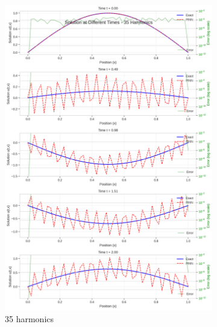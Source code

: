 \begin{figure}[H]
    \centering
    \begin{subfigure}[b]{0.32\textwidth}
        \centering
        \includegraphics[width=\textwidth]{figures/time_slices_35h.png}
        \caption{35 harmonics}
    \end{subfigure}
    \hfill
    \begin{subfigure}[b]{0.32\textwidth}
        \centering

\end{subfigure}
\end{figure}

